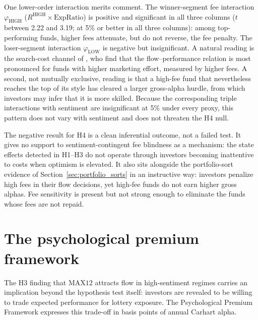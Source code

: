 \documentclass[12pt, oneside]{report}
\let\phi\varphi
\begin{document}
One lower-order interaction merits comment. The winner-segment fee
interaction $\phi_{\text{HIGH}}$ ($R^{\text{HIGH}} \times
\text{ExpRatio}$) is positive and significant in all three columns
($t$ between 2.22 and 3.19; at 5\% or better in all three
columns): among top-performing funds, higher fees
attenuate, but do not reverse, the fee penalty. The loser-segment
interaction $\phi_{\text{LOW}}$ is negative but insignificant. A natural
reading is the search-cost channel of \textcite{SirriTufano1998}, who
find that the flow--performance relation is most pronounced for funds
with higher marketing effort, measured by higher fees. A second, not
mutually exclusive, reading is that a high-fee fund that nevertheless
reaches the top of its style has cleared a larger gross-alpha hurdle,
from which investors may infer that it is more skilled. Because the corresponding
triple interactions with sentiment are insignificant at 5\% under every
proxy, this pattern does not vary with sentiment and does not threaten
the H4 null.

The negative result for H4 is a clean inferential outcome, not a failed
test. It gives no support to sentiment-contingent fee blindness as a
mechanism: the state effects detected in H1--H3 do not operate through
investors becoming inattentive to costs when optimism is elevated. It
also sits alongside the portfolio-sort evidence of
Section~\ref{sec:portfolio_sorts} in an instructive way: investors
penalize high fees in their flow decisions, yet high-fee funds do not
earn higher gross alphas. Fee sensitivity is present but not strong
enough to eliminate the funds whose fees are not repaid.

\section{The psychological premium framework}
\label{sec:ppf}

The H3 finding that $\text{MAX12}$ attracts flow in high-sentiment
regimes carries an implication beyond the hypothesis test itself:
investors are revealed to be willing to trade expected performance for
lottery exposure. The Psychological Premium Framework expresses this
trade-off in basis points of annual Carhart alpha.
\end{document}
